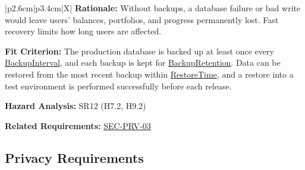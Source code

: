 \documentclass[12pt]{article}
\newcommand{\const}[1]{\hyperlink{const:#1}{\textsf{#1}}}
\begin{document}
\begin{xltabular}{\textwidth}{|p{2.6cm}|p{3.4cm}|X|}
\textbf{Rationale:} Without backups, a database failure or bad write would leave users' balances, portfolios, and progress permanently lost. Fast recovery limits how long users are affected.

\textbf{Fit Criterion:} The production database is backed up at least once every \const{BackupInterval}, and each backup is kept for \const{BackupRetention}. Data can be restored from the most recent backup within \const{RestoreTime}, and a restore into a test environment is performed successfully before each release.

\textbf{Hazard Analysis:} SR12 (H7.2, H9.2)

\textbf{Related Requirements:} \hyperlink{req:SEC-PRV-03}{SEC-PRV-03}\\
\hline

\end{xltabular}
\subsection{Privacy Requirements}
\end{document}
